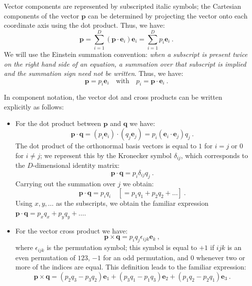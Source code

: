 Vector components are represented by subscripted italic symbols; the Cartesian components of the vector $\mathbf{p}$ can be determined by projecting the vector onto each coordinate axis using the dot product.  Thus, we have:
\begin{equation}
	\mathbf{p} = \sum_{i=1}^{D}(\mathbf{p}\cdot\mathbf{e}_i)\mathbf{e}_i = \sum_{i=1}^D p_i\mathbf{e}_i \ .
\end{equation}
We will use the Einstein summation convention: \textit{when a subscript is present twice on the right hand side of an equation, a summation over that subscript is implied and the summation sign need not be written}.  
Thus, we have:
\begin{equation}
	\mathbf{p} = p_i\mathbf{e}_i\quad\text{with}\quad p_i = \mathbf{p}\cdot\mathbf{e}_i \ .
\end{equation}

\noindent In component notation, the vector dot and cross products can be written explicitly as follows:
\begin{itemize}
	\item For the dot product between $\mathbf{p}$ and $\mathbf{q}$ we have:
	\[
		\mathbf{p}\cdot\mathbf{q} = (p_i\mathbf{e}_i)\cdot(q_j\mathbf{e}_j)
		= p_i (\mathbf{e}_i\cdot\mathbf{e}_j) q_j \ .
	\]
	The dot product of the orthonormal basis vectors is equal to $1$ for $i=j$ or $0$ for $i\ne j$; we represent this by the Kronecker symbol $\delta_{ij}$, which corresponds to the $D$-dimensional identity matrix:
	\[
		\mathbf{p}\cdot\mathbf{q} = p_i \delta_{ij} q_j \ .
	\]
	Carrying out the summation over $j$ we obtain:
	\[
		\mathbf{p}\cdot\mathbf{q} = p_i q_i \quad [=p_1q_1+p_2q_2+\ldots ]\ .
	\]
	Using $x,y,\ldots$ as the subscripts, we obtain the familiar expression $\mathbf{p}\cdot\mathbf{q} =p_xq_x+p_yq_y+\ldots$.
	\item For the vector cross product we have:
	\[
		\mathbf{p}\times\mathbf{q} = p_iq_j \epsilon_{ijk} \mathbf{e}_k \ ,
	\]
	where $\epsilon_{ijk}$ is the permutation symbol; this symbol is equal to $+1$ if $ijk$ is an even permutation of $123$, $-1$ for an odd permutation, and $0$ whenever two or more of the indices are equal.  This definition leads to the familiar expression:
	\[
		\mathbf{p}\times\mathbf{q} = (p_2q_3-p_3q_2)\mathbf{e}_1 +(p_3q_1-p_1q_3)\mathbf{e}_2 +(p_1q_2-p_2q_1)\mathbf{e}_3 \ .
	\] 
\end{itemize}

